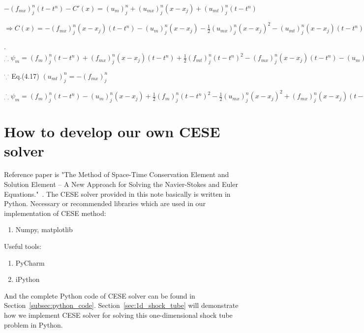 \documentclass[a4paper,12pt]{article}
\begin{document}
\begin{enumerate}
        \hspace{8mm}$-(f_{mx})^{n}_{j}(t-t^{n})-C'(x)=(u_{m})^{n}_{j}+(u_{mx})^{n}_{j}(x-x_{j})+(u_{mt})^{n}_{j}(t-t^{n})$

        \hspace{8mm}$\Rightarrow C(x)=-(f_{mx})^{n}_{j}(x-x_{j})(t-t^{n})-(u_{m})^{n}_{j}(x-x_{j})-\frac{1}{2}(u_{mx})^{n}_{j}(x-x_{j})^{2}-(u_{mt})^{n}_{j}(x-x_{j})(t-t^{n})$

        . \hspace{4mm}${}_\cdot{}^\cdot{}_\cdot~\psi_{m}=(f_{m})^{n}_{j}(t-t^{n})+(f_{mx})^{n}_{j}(x-x_{j})(t-t^{n})+\frac{1}{2}(f_{mt})^{n}_{j}(t-t^{n})^{2}-(f_{mx})^{n}_{j}(x-x_{j})(t-t^{n})-(u_{m})^{n}_{j}(x-x_{j})-\frac{1}{2}(u_{mx})^{n}_{j}(x-x_{j})^{2}-(u_{mt})^{n}_{j}(x-x_{j})(t-t^{n})$

        \hspace{4mm}${}^\cdot{}_\cdot{}^\cdot$ Eq.(4.17) $(u_{mt})^{n}_{j}=-(f_{mx})^{n}_{j}$

        \hspace{4mm}${}_\cdot{}^\cdot{}_\cdot~\psi_{m}=(f_{m})^{n}_{j}(t-t^{n})-(u_{m})^{n}_{j}(x-x_{j})+\frac{1}{2}(f_{m})^{n}_{j}(t-t^{n})^{2}-\frac{1}{2}(u_{mx})^{n}_{j}(x-x_{j})^{2}+(f_{mx})^{n}_{j}(x-x_{j})(t-t^{n})$
 \end{enumerate}

\section{How to develop our own CESE solver}
 \label{sec:development_cese}
Reference paper is "The Method of Space-Time Conservation Element and Solution Element -- A New Approach for Solving the Navier-Stokes and Euler Equations."~\cite{CESE_Shin_Chung_Chang_1995}. The CESE solver provided in this note basically is written in Python.  
Necessary or recommended libraries which are used in our implementation of CESE method: 
 \begin{enumerate}
  \item Numpy, matplotlib
 \end{enumerate}
Useful tools:
 \begin{enumerate}
  \item PyCharm
  \item iPython
 \end{enumerate}
And the complete Python code of CESE solver can be found in Section~\ref{subsec:python_code}. Section~\ref{sec:1d_shock_tube} will  demonstrate how we implement CESE solver for solving this one-dimensional shock tube problem in Python.
\end{document}
